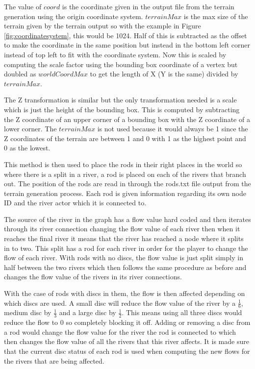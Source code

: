 The value of \(coord\) is the coordinate given in the output file from the terrain generation using the origin coordinate system. \(terrainMax\) is the max size of the terrain given by the terrain output so with the example in Figure \ref{fig:coordinatesystem}, this would be 1024. Half of this is subtracted as the offset to make the coordinate in the same position but instead in the bottom left corner instead of top left to fit with the coordinate system. Now this is scaled by computing the scale factor using the bounding box coordinate of a vertex but doubled as \(worldCoordMax\) to get the length of X (Y is the same) divided by \(terrainMax\).
\newline
\par
The Z transformation is similar but the only transformation needed is a scale which is just the height of the bounding box. This is computed by subtracting the Z coordinate of an upper corner of a bounding box with the Z coordinate of a lower corner. The \(terrainMax\) is not used because it would always be 1 since the Z coordinates of the terrain are between 1 and 0 with 1 as the highest point and 0 as the lowest.
\newline
\par
This method is then used to place the rods in their right places in the world so where there is a split in a river, a rod is placed on each of the rivers that branch out. The position of the rods are read in through the rods.txt file output from the terrain generation process. Each rod is given information regarding its own node ID and the river actor which it is connected to.
\newline
\par
The source of the river in the graph has a flow value hard coded and then iterates through its river connection changing the flow value of each river then when it reaches the final river it means that the river has reached a node where it splits in to two. This split has a rod for each river in order for the player to change the flow of each river. With rods with no discs, the flow value is just split simply in half between the two rivers which then follows the same procedure as before and changes the flow value of the rivers in its river connections.
\newline
\par
With the case of rods with discs in them, the flow is then affected depending on which discs are used. A small disc will reduce the flow value of the river by a \(\frac{1}{6}\), medium disc by \(\frac{1}{3}\) and a large disc by \(\frac{1}{2}\). This means using all three discs would reduce the flow to 0 so completely blocking it off. Adding or removing a disc from a rod would change the flow value for the river the rod is connected to which then changes the flow value of all the rivers that this river affects. It is made sure that the current disc status of each rod is used when computing the new flows for the rivers that are being affected.
